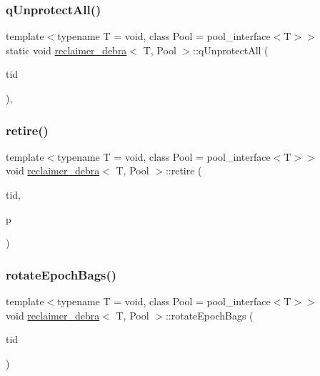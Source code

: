\subsubsection{\texorpdfstring{q\+Unprotect\+All()}{qUnprotectAll()}}
{\footnotesize\ttfamily template$<$typename T  = void, class Pool  = pool\+\_\+interface$<$\+T$>$$>$ \\
static void \hyperlink{classreclaimer__debra}{reclaimer\+\_\+debra}$<$ T, Pool $>$\+::q\+Unprotect\+All (\begin{DoxyParamCaption}\item[{const int}]{tid }\end{DoxyParamCaption})\hspace{0.3cm}{\ttfamily [inline]}, {\ttfamily [static]}}

\mbox{\label{classreclaimer__debra_a146fa88ad65ef5a05d253ecb7281c698}} 
\subsubsection{\texorpdfstring{retire()}{retire()}}
{\footnotesize\ttfamily template$<$typename T  = void, class Pool  = pool\+\_\+interface$<$\+T$>$$>$ \\
void \hyperlink{classreclaimer__debra}{reclaimer\+\_\+debra}$<$ T, Pool $>$\+::retire (\begin{DoxyParamCaption}\item[{const int}]{tid,  }\item[{T $\ast$}]{p }\end{DoxyParamCaption})\hspace{0.3cm}{\ttfamily [inline]}}

\mbox{\label{classreclaimer__debra_a144015f870cce9bd1edbf95e109875ae}} 
\subsubsection{\texorpdfstring{rotate\+Epoch\+Bags()}{rotateEpochBags()}}
{\footnotesize\ttfamily template$<$typename T  = void, class Pool  = pool\+\_\+interface$<$\+T$>$$>$ \\
void \hyperlink{classreclaimer__debra}{reclaimer\+\_\+debra}$<$ T, Pool $>$\+::rotate\+Epoch\+Bags (\begin{DoxyParamCaption}\item[{const int}]{tid }\end{DoxyParamCaption})\hspace{0.3cm}{\ttfamily [inline]}}

